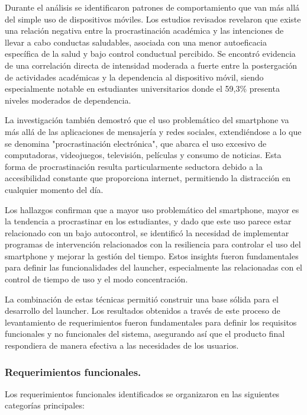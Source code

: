 Durante el análisis se identificaron patrones de comportamiento que van más allá del simple uso de dispositivos móviles. Los estudios revisados revelaron que existe una relación negativa entre la procrastinación académica y las intenciones de llevar a cabo conductas saludables, asociada con una menor autoeficacia específica de la salud y bajo control conductual percibido. Se encontró evidencia de una correlación directa de intensidad moderada a fuerte entre la postergación de actividades académicas y la dependencia al dispositivo móvil, siendo especialmente notable en estudiantes universitarios donde el 59,3\% presenta niveles moderados de dependencia.

La investigación también demostró que el uso problemático del smartphone va más allá de las aplicaciones de mensajería y redes sociales, extendiéndose a lo que se denomina "procrastinación electrónica", que abarca el uso excesivo de computadoras, videojuegos, televisión, películas y consumo de noticias. Esta forma de procrastinación resulta particularmente seductora debido a la accesibilidad constante que proporciona internet, permitiendo la distracción en cualquier momento del día.

Los hallazgos confirman que a mayor uso problemático del smartphone, mayor es la tendencia a procrastinar en los estudiantes, y dado que este uso parece estar relacionado con un bajo autocontrol, se identificó la necesidad de implementar programas de intervención relacionados con la resiliencia para controlar el uso del smartphone y mejorar la gestión del tiempo. Estos insights fueron fundamentales para definir las funcionalidades del launcher, especialmente las relacionadas con el control de tiempo de uso y el modo concentración.

La combinación de estas técnicas permitió construir una base sólida para el desarrollo del launcher. Los resultados obtenidos a través de este proceso de levantamiento de requerimientos fueron fundamentales para definir los requisitos funcionales y no funcionales del sistema, asegurando así que el producto final respondiera de manera efectiva a las necesidades de los usuarios.

\subsubsection{Requerimientos funcionales.}

Los requerimientos funcionales identificados se organizaron en las siguientes categorías principales:

